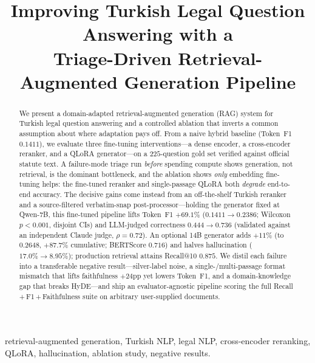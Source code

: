 \documentclass[conference]{IEEEtran}
\newcommand{\best}[1]{\textbf{#1}}
\begin{document}
\title{Improving Turkish Legal Question Answering with a\\
Triage-Driven Retrieval-Augmented Generation Pipeline}

\author{
}

\maketitle

\begin{abstract}
We present a domain-adapted retrieval-augmented generation (RAG) system for
Turkish legal question answering and a controlled ablation that inverts a common
assumption about where adaptation pays off. From a naive hybrid baseline
(Token~F1 $0.1411$), we evaluate three fine-tuning interventions---a dense
encoder, a cross-encoder reranker, and a QLoRA generator---on a $225$-question
gold set verified against official statute text. A failure-mode triage run
\emph{before} spending compute shows generation, not retrieval, is the dominant
bottleneck, and the ablation shows \emph{only} embedding fine-tuning helps: the
fine-tuned reranker and single-passage QLoRA both \emph{degrade} end-to-end
accuracy. The decisive gains come instead from an off-the-shelf Turkish reranker
and a source-filtered verbatim-snap post-processor---holding the generator fixed
at Qwen-7B, this fine-tuned pipeline lifts Token~F1 $+69.1\%$
($0.1411\rightarrow 0.2386$; Wilcoxon $p{<}0.001$, disjoint CIs) and LLM-judged
correctness $0.444\rightarrow 0.736$ (validated against an independent Claude
judge, $\rho{=}0.72$). An optional 14B generator adds $+11\%$ (to
\best{$0.2648$}, $+87.7\%$ cumulative; BERTScore $0.716$) and halves
hallucination ($17.0\%\rightarrow 8.95\%$); production retrieval attains
Recall@10 $0.875$. We distil each failure into a transferable negative
result---silver-label noise, a single-/multi-passage format mismatch that lifts
faithfulness $+24$pp yet lowers Token~F1, and a domain-knowledge gap that breaks
HyDE---and ship an evaluator-agnostic pipeline scoring the full
Recall\,+\,F1\,+\,Faithfulness suite on arbitrary user-supplied documents.
\end{abstract}

\begin{IEEEkeywords}
retrieval-augmented generation, Turkish NLP, legal NLP, cross-encoder
reranking, QLoRA, hallucination, ablation study, negative results.
\end{IEEEkeywords}
\end{document}
